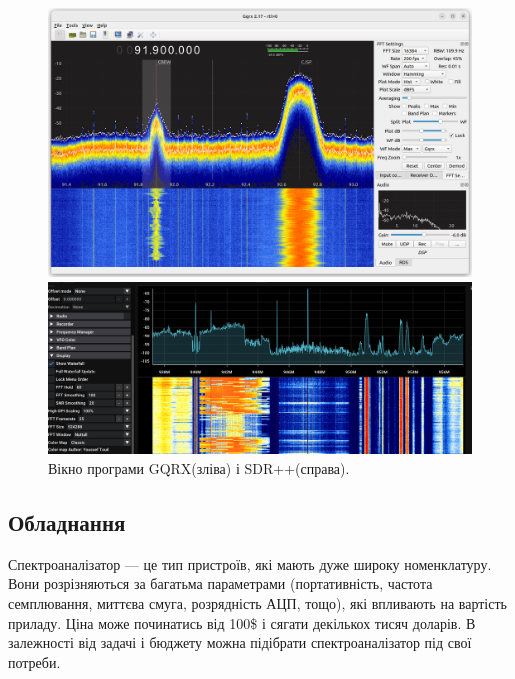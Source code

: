 \documentclass{article}
\begin{document}
\begin{figure}[H]
    \centering
       \begin{minipage}{0.35\textwidth}
        \centering
        \includegraphics[width=\textwidth]{images/gqrx.png}
    \end{minipage}
    \begin{minipage}{0.55\textwidth}
        \centering
        \includegraphics[width=\textwidth]{images/sdrpp.png}
    \end{minipage}
    \caption{Вікно програми GQRX(зліва) і SDR++(справа).}
\end{figure}

\subsection{Обладнання}

Спектроаналізатор --- це тип пристроїв, які мають дуже широку номенклатуру. Вони розрізняються за багатьма параметрами (портативність, частота семплювання, миттєва смуга, розрядність АЦП, тощо), які впливають на вартість приладу. Ціна може починатись від 100\$ і сягати декількох тисяч доларів. В залежності від задачі і бюджету можна підібрати спектроаналізатор під свої потреби.
\end{document}
